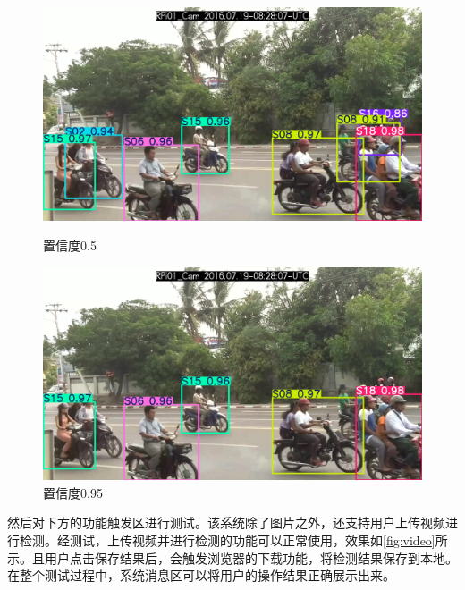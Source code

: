 \begin{figure}[!htb]
    \centering
    \begin{minipage}{0.45\textwidth} %
        \centering
        \includegraphics[width=\textwidth]{figs/chap05/conf1.jpg}
        \caption{置信度0.5}
        \label{fig:conf1}
    \end{minipage}
    \hfill %
    \begin{minipage}{0.45\textwidth}
        \centering
        \includegraphics[width=\textwidth]{figs/chap05/conf2.jpg}
        \caption{置信度0.95}
        \label{fig:conf2}
    \end{minipage}
  \end{figure}

然后对下方的功能触发区进行测试。该系统除了图片之外，还支持用户上传视频进行检测。经测试，上传视频并进行检测的功能可以正常使用，效果如\ref{fig:video}所示。且用户点击保存结果后，会触发浏览器的下载功能，将检测结果保存到本地。在整个测试过程中，系统消息区可以将用户的操作结果正确展示出来。

